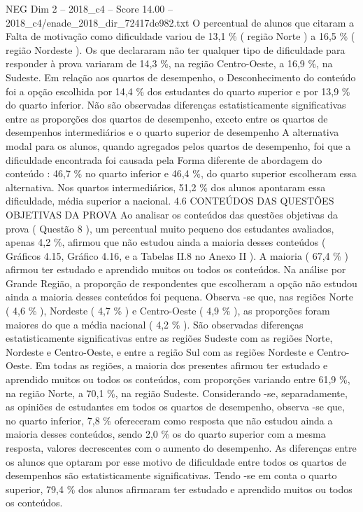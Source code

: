 \begin{textsample}{NEG Dim 2 – 2018\_c4 – Score 14.00 – 2018\_c4/enade\_2018\_dir\_72417de982.txt}
O percentual de alunos que citaram a Falta de motivação como dificuldade variou de 13,1 \% ( região Norte ) a 16,5 \% ( região Nordeste ).
Os que declararam não ter qualquer tipo de dificuldade para responder à prova variaram de 14,3 \%, na região Centro-Oeste, a 16,9 \%, na Sudeste.
Em relação aos quartos de desempenho, o Desconhecimento do conteúdo foi a opção escolhida por 14,4 \% dos estudantes do quarto superior e por 13,9 \% do quarto inferior.
Não são observadas diferenças estatisticamente significativas entre as proporções dos quartos de desempenho, exceto entre os quartos de desempenhos intermediários e o quarto superior de desempenho A alternativa modal para os alunos, quando agregados pelos quartos de desempenho, foi que a dificuldade encontrada foi causada pela Forma diferente de abordagem do conteúdo : 46,7 \% no quarto inferior e 46,4 \%, do quarto superior escolheram essa alternativa.
Nos quartos intermediários, 51,2 \% dos alunos apontaram essa dificuldade, média superior a nacional. 4.6 CONTEÚDOS DAS QUESTÕES OBJETIVAS DA PROVA Ao analisar os conteúdos das questões objetivas da prova ( Questão 8 ), um percentual muito pequeno dos estudantes avaliados, apenas 4,2 \%, afirmou que não estudou ainda a maioria desses conteúdos ( Gráficos 4.15, Gráfico 4.16, e a Tabelas II.8 no Anexo II ).
A maioria ( 67,4 \% ) afirmou ter estudado e aprendido muitos ou todos os conteúdos.
Na análise por Grande Região, a proporção de respondentes que escolheram a opção não estudou ainda a maioria desses conteúdos foi pequena.
Observa -se que, nas regiões Norte ( 4,6 \% ), Nordeste ( 4,7 \% ) e Centro-Oeste ( 4,9 \% ), as proporções foram maiores do que a média nacional ( 4,2 \% ).
São observadas diferenças estatisticamente significativas entre as regiões Sudeste com as regiões Norte, Nordeste e Centro-Oeste, e entre a região Sul com as regiões Nordeste e Centro-Oeste.
Em todas as regiões, a maioria dos presentes afirmou ter estudado e aprendido muitos ou todos os conteúdos, com proporções variando entre 61,9 \%, na região Norte, a 70,1 \%, na região Sudeste.
Considerando -se, separadamente, as opiniões de estudantes em todos os quartos de desempenho, observa -se que, no quarto inferior, 7,8 \% ofereceram como resposta que não estudou ainda a maioria desses conteúdos, sendo 2,0 \% os do quarto superior com a mesma resposta, valores decrescentes com o aumento do desempenho.
As diferenças entre os alunos que optaram por esse motivo de dificuldade entre todos os quartos de desempenhos são estatisticamente significativas.
Tendo -se em conta o quarto superior, 79,4 \% dos alunos afirmaram ter estudado e aprendido muitos ou todos os conteúdos.

\end{textsample}
